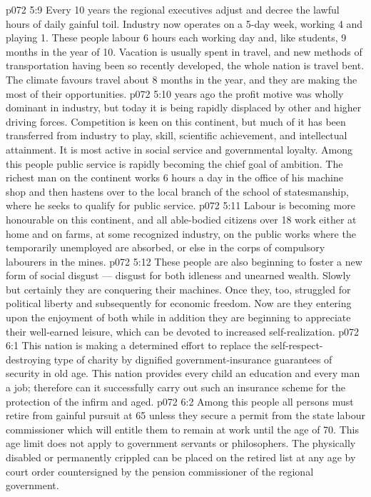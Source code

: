 \vs p072 5:9 \pc Every 10 years the regional executives adjust and decree the lawful hours of daily gainful toil. Industry now operates on a 5\hyp{}day week, working 4 and playing 1. These people labour 6 hours each working day and, like students, 9 months in the year of 10. Vacation is usually spent in travel, and new methods of transportation having been so recently developed, the whole nation is travel bent. The climate favours travel about 8 months in the year, and they are making the most of their opportunities.
\vs p072 5:10  years ago the profit motive was wholly dominant in industry, but today it is being rapidly displaced by other and higher driving forces. Competition is keen on this continent, but much of it has been transferred from industry to play, skill, scientific achievement, and intellectual attainment. It is most active in social service and governmental loyalty. Among this people public service is rapidly becoming the chief goal of ambition. The richest man on the continent works 6 hours a day in the office of his machine shop and then hastens over to the local branch of the school of statesmanship, where he seeks to qualify for public service.
\vs p072 5:11 Labour is becoming more honourable on this continent, and all able\hyp{}bodied citizens over 18 work either at home and on farms, at some recognized industry, on the public works where the temporarily unemployed are absorbed, or else in the corps of compulsory labourers in the mines.
\vs p072 5:12 These people are also beginning to foster a new form of social disgust --- disgust for both idleness and unearned wealth. Slowly but certainly they are conquering their machines. Once they, too, struggled for political liberty and subsequently for economic freedom. Now are they entering upon the enjoyment of both while in addition they are beginning to appreciate their well\hyp{}earned leisure, which can be devoted to increased self\hyp{}realization.
\vs p072 6:1 This nation is making a determined effort to replace the self\hyp{}respect\hyp{}destroying type of charity by dignified government\hyp{}insurance guarantees of security in old age. This nation provides every child an education and every man a job; therefore can it successfully carry out such an insurance scheme for the protection of the infirm and aged.
\vs p072 6:2 Among this people all persons must retire from gainful pursuit at 65 unless they secure a permit from the state labour commissioner which will entitle them to remain at work until the age of 70. This age limit does not apply to government servants or philosophers. The physically disabled or permanently crippled can be placed on the retired list at any age by court order countersigned by the pension commissioner of the regional government.
